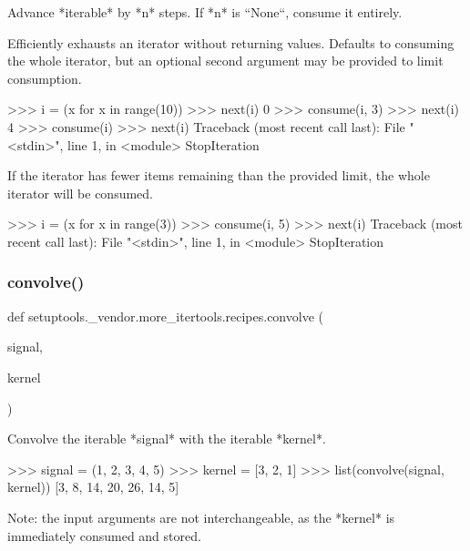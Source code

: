 \begin{DoxyVerb}Advance *iterable* by *n* steps. If *n* is ``None``, consume it
entirely.

Efficiently exhausts an iterator without returning values. Defaults to
consuming the whole iterator, but an optional second argument may be
provided to limit consumption.

    >>> i = (x for x in range(10))
    >>> next(i)
    0
    >>> consume(i, 3)
    >>> next(i)
    4
    >>> consume(i)
    >>> next(i)
    Traceback (most recent call last):
      File "<stdin>", line 1, in <module>
    StopIteration

If the iterator has fewer items remaining than the provided limit, the
whole iterator will be consumed.

    >>> i = (x for x in range(3))
    >>> consume(i, 5)
    >>> next(i)
    Traceback (most recent call last):
      File "<stdin>", line 1, in <module>
    StopIteration\end{DoxyVerb}
 \mbox{\label{namespacesetuptools_1_1__vendor_1_1more__itertools_1_1recipes_a2dac2c2abcf911c2d3c2a0629c153d92}} 
\subsubsection{\texorpdfstring{convolve()}{convolve()}}
{\footnotesize\ttfamily def setuptools.\+\_\+vendor.\+more\+\_\+itertools.\+recipes.\+convolve (\begin{DoxyParamCaption}\item[{}]{signal,  }\item[{}]{kernel }\end{DoxyParamCaption})}

\begin{DoxyVerb}Convolve the iterable *signal* with the iterable *kernel*.

    >>> signal = (1, 2, 3, 4, 5)
    >>> kernel = [3, 2, 1]
    >>> list(convolve(signal, kernel))
    [3, 8, 14, 20, 26, 14, 5]

Note: the input arguments are not interchangeable, as the *kernel*
is immediately consumed and stored.\end{DoxyVerb}
 \mbox{\label{namespacesetuptools_1_1__vendor_1_1more__itertools_1_1recipes_a5b93842908e515ca08adb9f21005964d}} 

